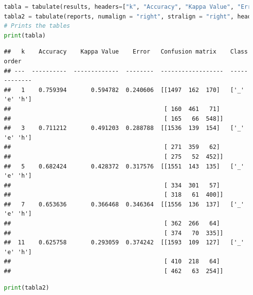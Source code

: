 \documentclass[
]{article}
\begin{document}
\begin{lstlisting}[language=Python]
tabla = tabulate(results, headers=["k", "Accuracy", "Kappa Value", "Error ", "Confusion matrix", "Class order"])
tabla2 = tabulate(reports, numalign = "right", stralign = "right", headers = ["k", "Others"])
# Prints the tables
print(tabla)
\end{lstlisting}

\begin{lstlisting}
##   k    Accuracy    Kappa Value    Error   Confusion matrix    Class order
## ---  ----------  -------------  --------  ------------------  -------------
##   1    0.759394       0.594782  0.240606  [[1497  162  170]   ['_' 'e' 'h']
##                                            [ 160  461   71]
##                                            [ 165   66  548]]
##   3    0.711212       0.491203  0.288788  [[1536  139  154]   ['_' 'e' 'h']
##                                            [ 271  359   62]
##                                            [ 275   52  452]]
##   5    0.682424       0.428372  0.317576  [[1551  143  135]   ['_' 'e' 'h']
##                                            [ 334  301   57]
##                                            [ 318   61  400]]
##   7    0.653636       0.366468  0.346364  [[1556  136  137]   ['_' 'e' 'h']
##                                            [ 362  266   64]
##                                            [ 374   70  335]]
##  11    0.625758       0.293059  0.374242  [[1593  109  127]   ['_' 'e' 'h']
##                                            [ 410  218   64]
##                                            [ 462   63  254]]
\end{lstlisting}

\begin{lstlisting}[language=Python]
print(tabla2)
\end{lstlisting}
\end{document}

